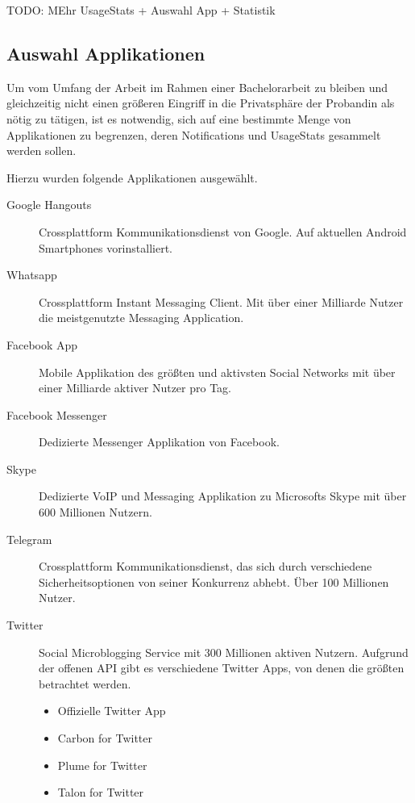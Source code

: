 TODO: MEhr UsageStats + Auswahl App + Statistik

\subsection{Auswahl Applikationen}

Um vom Umfang der Arbeit im Rahmen einer Bachelorarbeit zu bleiben und gleichzeitig nicht einen größeren Eingriff in die Privatsphäre der Probandin als nötig zu tätigen,
ist es notwendig, sich auf eine bestimmte Menge von Applikationen zu begrenzen, deren Notifications und UsageStats gesammelt werden sollen.

Hierzu wurden folgende Applikationen ausgewählt.
\begin{description}
  \item [Google Hangouts] Crossplattform Kommunikationsdienst von Google. Auf aktuellen Android Smartphones vorinstalliert.
  \item [Whatsapp] Crossplattform Instant Messaging Client. Mit über einer Milliarde Nutzer die meistgenutzte Messaging Application\cite{whatsappuser}.
  \item [Facebook App] Mobile Applikation des größten und aktivsten Social Networks mit über einer Milliarde aktiver Nutzer pro Tag\cite{facebookuser}.
  \item [Facebook Messenger] Dedizierte Messenger Applikation von Facebook.
  \item [Skype] Dedizierte VoIP und Messaging Applikation zu Microsofts Skype mit über 600 Millionen Nutzern\cite{skypeuser}.
  \item [Telegram] Crossplattform Kommunikationsdienst, das sich durch verschiedene Sicherheitsoptionen von seiner Konkurrenz abhebt. Über 100 Millionen Nutzer\cite{telegramuser}.
  \item [Twitter] Social Microblogging Service mit 300 Millionen aktiven Nutzern. Aufgrund der offenen API gibt es verschiedene Twitter Apps, von denen die größten betrachtet werden.
  \begin{itemize}
      \item Offizielle Twitter App
      \item Carbon for Twitter
      \item Plume for Twitter
      \item Talon for Twitter
  \end{itemize}
\end{description}




